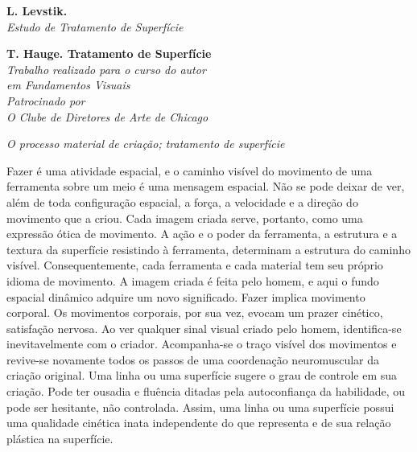 \documentclass[a4paper]{article}
\begin{document}
\begin{minipage}[t]{0.35\textwidth} %
\textbf{L. Levstik.} \\
\textit{Estudo de Tratamento de Superfície}

\vspace{2.5cm} %

\textbf{T. Hauge. Tratamento de Superfície} \\
\textit{Trabalho realizado para o curso do autor} \\
\textit{em Fundamentos Visuais} \\
\textit{Patrocinado por} \\
\textit{O Clube de Diretores de Arte de Chicago}
\end{minipage}
\hfill %
\begin{minipage}[t]{0.6\textwidth} %
\vspace*{2cm} %

\textit{O processo material de criação; tratamento de superfície}

\vspace{0.5cm} %

Fazer é uma atividade espacial, e o caminho visível do movimento de uma ferramenta sobre um meio é uma mensagem espacial. Não se pode deixar de ver, além de toda configuração espacial, a força, a velocidade e a direção do movimento que a criou. Cada imagem criada serve, portanto, como uma expressão ótica de movimento. A ação e o poder da ferramenta, a estrutura e a textura da superfície resistindo à ferramenta, determinam a estrutura do caminho visível. Consequentemente, cada ferramenta e cada material tem seu próprio idioma de movimento. A imagem criada é feita pelo homem, e aqui o fundo espacial dinâmico adquire um novo significado. Fazer implica movimento corporal. Os movimentos corporais, por sua vez, evocam um prazer cinético, satisfação nervosa. Ao ver qualquer sinal visual criado pelo homem, identifica-se inevitavelmente com o criador. Acompanha-se o traço visível dos movimentos e revive-se novamente todos os passos de uma coordenação neuromuscular da criação original. Uma linha ou uma superfície sugere o grau de controle em sua criação. Pode ter ousadia e fluência ditadas pela autoconfiança da habilidade, ou pode ser hesitante, não controlada. Assim, uma linha ou uma superfície possui uma qualidade cinética inata independente do que representa e de sua relação plástica na superfície.
\end{minipage}
\endgroup
\end{document}
